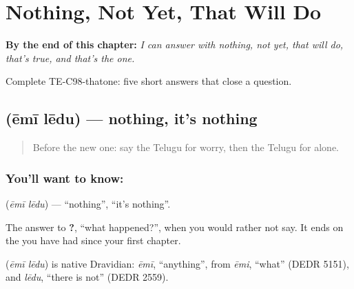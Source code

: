 
\chapter{Nothing, Not Yet, That Will Do}
\label{ch:te-nothing-not-yet}

\begin{chapteropening}
\textbf{By the end of this chapter:} \emph{I can answer with nothing, not yet, that will do, that's true, and that's the one.}

Complete TE-C98-thatone: five short answers that close a question.
\end{chapteropening}

\section[\texorpdfstring{\te{ఏమీ} \te{లేదు} (ēmī lēdu)}{ఏమీ లేదు (ēmī lēdu)}]{  (ēmī lēdu) — nothing, it's nothing}

\label{lesson:TE-C98-nothing}



\begin{quote}
Before the new one: say the Telugu for worry, then the Telugu for alone.
\end{quote}

\subsection*{You'll want to know:  }
\textbf{ } (\emph{ēmī lēdu}) — \textquotedblleft{}nothing\textquotedblright{}, \textquotedblleft{}it's nothing\textquotedblright{}.

The answer to \textbf{?}, \textquotedblleft{}what happened?\textquotedblright{}, when you would rather not say. It ends on the \textbf{} you have had since your first chapter.

\begin{cousinweb}
\textbf{ } (\emph{ēmī lēdu}) is native Dravidian: \emph{ēmī}, \textquotedblleft{}anything\textquotedblright{}, from \emph{ēmi}, \textquotedblleft{}what\textquotedblright{} (DEDR 5151), and \emph{lēdu}, \textquotedblleft{}there is not\textquotedblright{} (DEDR 2559).
\end{cousinweb}

